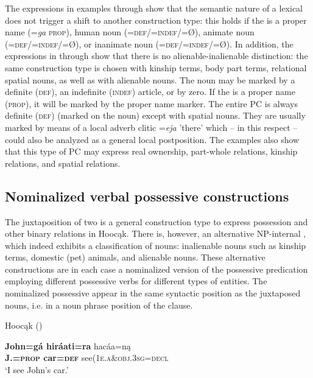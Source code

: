 \documentclass[output=paper]{LSP/langsci}
\begin{document}
The expressions in examples  through  show that the semantic nature of a lexical  does not trigger a shift to another construction type: this holds if the  is a proper name (=\textit{ga} \textsc{prop}), human noun (=\textsc{def/=indef/}=Ø), animate noun (=\textsc{def/=indef}/=Ø), or inanimate noun (=\textsc{def/=indef}/=Ø). In addition, the expressions in  through  show that there is no alienable-inalienable distinction: the same construction type is chosen with kinship terms, body part terms, relational spatial nouns, as well as with alienable nouns. The  noun may be marked by a definite (\textsc{def}), an indefinite (\textsc{indef}) article, or by zero. If the  is a proper name (\textsc{prop}), it will be marked by the proper name marker. The entire PC is always definite (\textsc{def}) (marked on the  noun) except with spatial nouns. They are usually marked by means of a local adverb clitic =\textit{eja} 'there' which – in this respect – could also be analyzed as a general local postposition. The examples also show that this type of PC may express real ownership, part-whole relations, kinship relations, and spatial relations.
 
\subsection{Nominalized verbal possessive constructions}\label{sec:helmbrecht:3.2} \label{nomvposs}

The juxtaposition of two  is a general construction type to express possession and other binary relations in Hoocąk. There is, however, an alternative NP-internal , which indeed exhibits a classification of nouns: inalienable nouns such as kinship terms, domestic (pet) animals, and alienable nouns. These alternative constructions are in each case a nominalized version of the possessive predication employing different possessive verbs for different types of  entities. The nominalized possessive  appear in the same syntactic position as the juxtaposed nouns, i.e. in a noun phrase position of the clause. 

\ea {}Hoocąk (\citealt[16]{Helmbrecht2003}) \label{seecar}

\ea 
\gll \textbf{John=g\'a hir\'aati=ra}  hac\'aa=n\k{a} \\
\textbf{J.=\textsc{prop} car=\textsc{def}} see(\textsc{1e.a}\&\textsc{obj.3sg}=\textsc{decl} \\
\glt `I see John's car.'  
\end{document}
